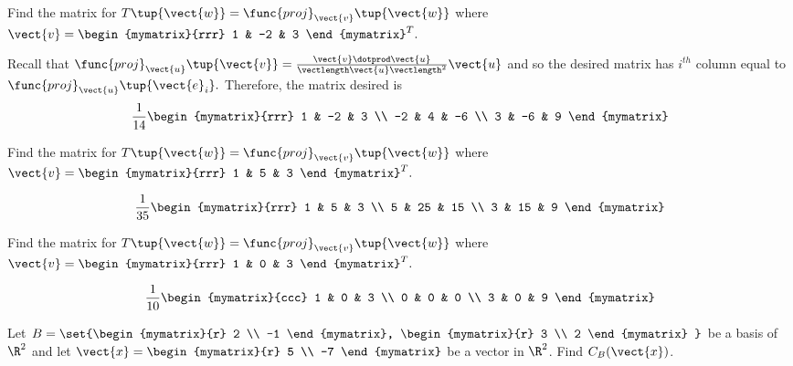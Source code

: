 \begin{enumialphparenastyle}
\begin{ex}  Find the matrix for $T\tup{\vect{w} } = \func{proj}_{\vect{v}}\tup{\vect{w}} $
where $\vect{v}=\begin{mymatrix}{rrr}
1 & -2 & 3
\end{mymatrix} ^{T}.$
\begin{sol}
 Recall that $\func{proj}_{\vect{u}}\tup{\vect{v}} =\frac{\vect{v}\dotprod\vect{u} }{\vectlength \vect{u}\vectlength ^{2}}\vect{u}$ and so the desired matrix
has $i^{th}$ column equal to $\func{proj}_{\vect{u}}\tup{\vect{e}_{i}} .$ Therefore, the matrix desired is
\[
\frac{1}{14}\begin{mymatrix}{rrr}
1 & -2 & 3 \\
-2 & 4 & -6 \\
3 & -6 & 9
\end{mymatrix}
\]
\end{sol}
\end{ex}

\begin{ex}  Find the matrix for $T\tup{\vect{w} } = \func{proj}_{\vect{v}}\tup{\vect{w}} $
where $\vect{v}=\begin{mymatrix}{rrr}
1 & 5 & 3
\end{mymatrix} ^{T}.$
\begin{sol}
\[
\frac{1}{35}\begin{mymatrix}{rrr}
1 & 5 & 3 \\
5 & 25 & 15 \\
3 & 15 & 9
\end{mymatrix}
\]
\end{sol}
\end{ex}

\begin{ex} Find the matrix for $T\tup{\vect{w} } = \func{proj}_{\vect{v}}\tup{\vect{w}} $
where $\vect{v}=\begin{mymatrix}{rrr}
1 & 0 & 3
\end{mymatrix} ^{T}.$ 
\begin{sol}
\[
\frac{1}{10}\begin{mymatrix}{ccc}
1 & 0 & 3 \\
0 & 0 & 0 \\
3 & 0 & 9
\end{mymatrix}
\]
\end{sol}
\end{ex}





\begin{ex}
Let $B = \set{\begin{mymatrix}{r}
2 \\
-1 
\end{mymatrix}, \begin{mymatrix}{r}
3 \\
2
\end{mymatrix} }$ be a basis of $\R^2$ and let $\vect{x} = \begin{mymatrix}{r}
5 \\
-7
\end{mymatrix}$ be a vector in $\R^2$. Find $C_B(\vect{x})$. 
\end{ex}


\end{enumialphparenastyle}
